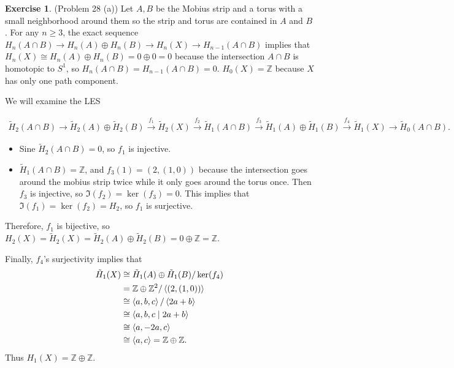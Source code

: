 \documentclass[psamsfonts]{amsart}
\theoremstyle{definition}
\newtheorem*{exer}{Exercise}
\theoremstyle{remark}
\numberwithin{equation}{section}
\begin{document}
\begin{exer}{(Problem 28 (a))}
  Let $A, B$ be the Mobius strip and a torus with a small neighborhood around them so the strip and torus are contained in $A$ and $B$.
  For any $n \geq 3$, the exact sequence $H_n(A \cap B) \rightarrow H_n(A) \oplus H_n(B) \rightarrow H_n(X) \rightarrow H_{n - 1}(A \cap B)$ implies that $H_n(X) \cong H_n(A) \oplus H_n(B) = 0 \oplus 0 = 0$ because the intersection $A \cap B$ is homotopic to $S^1$, so $H_n(A \cap B) = H_{n - 1}(A \cap B) = 0$.
  $H_0(X) = \mathbb{Z}$ because $X$ has only one path component.

  We will examine the LES

  \begin{align*}
    \tilde{H}_2(A \cap B) \rightarrow \tilde{H}_2(A) \oplus \tilde{H}_2(B) \xrightarrow{f_1} \tilde{H}_2(X) 
    \xrightarrow{f_2} \tilde{H}_1(A \cap B) \xrightarrow{f_3} \tilde{H}_1(A) \oplus \tilde{H}_1(B) \xrightarrow{f_4} \tilde{H}_1(X) 
    \rightarrow \tilde{H}_0(A \cap B).
  \end{align*}

  \begin{itemize}
    \item
      Sine $\tilde{H}_2(A \cap B) = 0$, so $f_1$ is injective.
    \item
      $\tilde{H}_1(A \cap B) = \mathbb{Z}$, and $f_3(1) = (2, (1, 0))$ because the intersection goes around the mobius strip twice while it only goes around the torus once.
      Then $f_3$ is injective, so $\Im(f_2) = \ker(f_3) = 0$.
      This implies that $\Im(f_1) = \ker(f_2) = H_2$, so $f_1$ is surjective.
  \end{itemize}

  Therefore, $f_1$ is bijective, so $H_2(X) = \tilde{H}_2(X) = \tilde{H}_2(A) \oplus \tilde{H}_2(B) = 0 \oplus \mathbb{Z} = \mathbb{Z}$.

  Finally, $f_4$'s surjectivity implies that 
  \begin{align*}
    \tilde{H}_1(X)
      &\cong \tilde{H}_1(A) \oplus \tilde{H}_1(B) / \ker(f_4) \\
      &= \mathbb{Z} \oplus \mathbb{Z}^2 / \ev{(2, (1, 0))} \\
      &\cong \ev{a, b, c} / \ev{2a + b} \\
      &\cong \ev{a, b, c \mid 2a + b} \\
      &\cong \ev{a, -2a, c} \\
      &\cong \ev{a, c} = \mathbb{Z} \oplus \mathbb{Z}.
  \end{align*}
  Thus $H_1(X) = \mathbb{Z} \oplus \mathbb{Z}$.
\end{exer}
\end{document}
